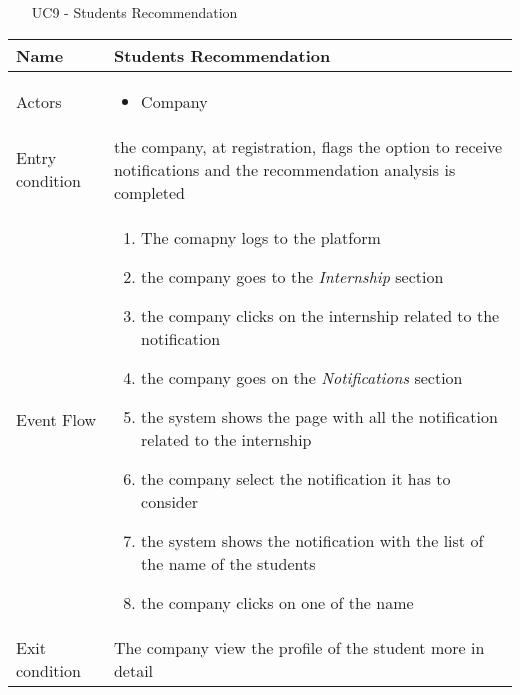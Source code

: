 				\begin{table} [H]
					\centering
					\begin{itemize}
						\item [UC9] - Students Recommendation
					\end{itemize}
					\begin{tabular}{|| P{7.5cm} | P{7.5cm} ||}
						\hline
						Name & Students Recommendation \\
						\hline
						Actors & \parbox{5cm}{\begin{itemize}
								\item Company
							\end{itemize}
						} \\
						\hline
						Entry condition & the company, at registration, flags the 
						option to receive notifications and the recommendation analysis is completed\\
						\hline
						Event Flow & \parbox{5cm}{\begin{enumerate}
								\item The comapny logs to the platform  
								\item the company goes to the \textit{Internship} 
								section
								\item  the company clicks on the internship related to the notification
								\item the company goes on the \textit{Notifications} section 
								\item the system shows the page with all the notification related to the internship
								\item the company select the notification it has to consider
								\item the system shows the notification with the list of the name of the students
								\item the company clicks on one of the name
						\end{enumerate}} \\
						\hline 
						Exit condition & The company view the profile of the student more in 
						detail \\
						\hline
					\end{tabular}
				\end{table}
				
				
			
